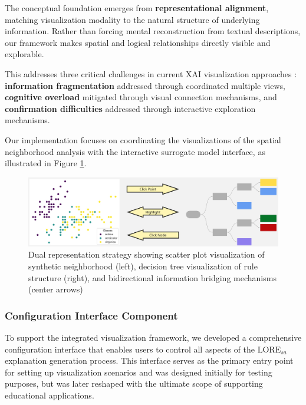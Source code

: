 The conceptual foundation emerges from \textbf{representational alignment}, matching visualization modality to the natural structure of underlying information. Rather than forcing mental reconstruction from textual descriptions, our framework makes spatial and logical relationships directly visible and explorable.

This addresses three critical challenges in current XAI visualization approaches \cite{8807299,cappuccio2024fipervisualbasedexplanationcombining}: \textbf{information fragmentation} addressed through coordinated multiple views, \textbf{cognitive overload} mitigated through visual connection mechanisms, and \textbf{confirmation difficulties} addressed through interactive exploration mechanisms.

Our implementation focuses on coordinating the visualizations of the spatial neighborhood analysis with the interactive surrogate model interface, as illustrated in Figure \ref{fig:dual_representation_strategy}.

\begin{figure}
  \centering
  \includegraphics[width=\textwidth]{images/dual_representation_strategy.jpg}
  \caption{Dual representation strategy showing scatter plot visualization of synthetic neighborhood (left), decision tree visualization of rule structure (right), and bidirectional information bridging mechanisms (center arrows)}
  \label{fig:dual_representation_strategy}
\end{figure}

\subsubsection{Configuration Interface Component}

To support the integrated visualization framework, we developed a comprehensive configuration interface that enables users to control all aspects of the $\text{LORE}_{sa}$ explanation generation process. This interface serves as the primary entry point for setting up visualization scenarios and was designed initially for testing purposes, but was later reshaped with the ultimate scope of supporting educational applications.

